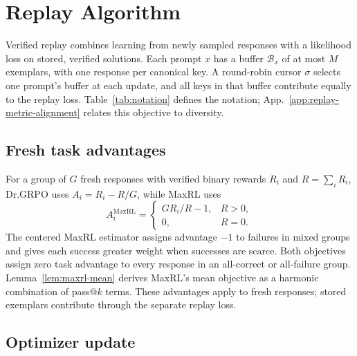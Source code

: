 

\section{Replay Algorithm}
\label{app:algorithm}

Verified replay combines learning from newly sampled responses with a
likelihood loss on stored, verified solutions. Each prompt $x$ has a buffer
$\mathcal B_x$ of at most $M$ exemplars, with one response per canonical key.
A round-robin cursor $\sigma$ selects one prompt's buffer at each update,
and all keys in that buffer contribute equally to the replay loss.
Table~\ref{tab:notation} defines the notation;
App.~\ref{app:replay-metric-alignment} relates this objective to diversity.

\subsection{Fresh task advantages}
\label{app:binary-maxrl}

For a group of $G$ fresh responses with verified binary rewards $R_i$ and
$R=\sum_i R_i$, Dr.GRPO uses $A_i=R_i-R/G$, while MaxRL uses
\[
 A_i^{\mathrm{MaxRL}}=
 \begin{cases}
 G R_i/R-1, & R>0,\\
 0, & R=0.
 \end{cases}
\]
The centered MaxRL estimator \citep{tajwar2026maxrl} assigns advantage $-1$
to failures in mixed groups and gives each success greater weight when
successes are scarce. Both objectives assign zero task advantage to every
response in an all-correct or all-failure group. Lemma~\ref{lem:maxrl-mean}
derives MaxRL's mean objective as a harmonic combination of pass@\(k\)
terms. These advantages apply to fresh responses; stored exemplars contribute
through the separate replay loss.

\subsection{Optimizer update}
\label{app:algorithm-update}


